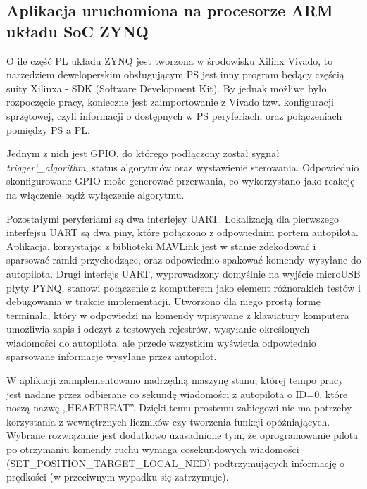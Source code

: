 \subsection{Aplikacja uruchomiona na procesorze ARM układu SoC ZYNQ}
O ile część PL układu ZYNQ jest tworzona w środowisku Xilinx Vivado, to narzędziem deweloperskim obsługującym PS jest inny program będący częścią suity Xilinxa - SDK (Software Development Kit). By jednak możliwe było rozpoczęcie pracy, konieczne jest zaimportowanie z Vivado tzw. konfiguracji sprzętowej, czyli informacji o dostępnych w PS peryferiach, oraz połączeniach pomiędzy PS a PL.

Jednym z nich jest GPIO, do którego podłączony został sygnał \textit{trigger\char`_algorithm}, status algorytmów oraz wystawienie sterowania. Odpowiednio skonfigurowane GPIO może generować przerwania, co wykorzystano jako reakcję na włączenie bądź wyłączenie algorytmu.

Pozostałymi peryferiami są dwa interfejsy UART. Lokalizacją dla pierwszego interfejsu UART są dwa piny, które połączono z odpowiednim portem autopilota. Aplikacja, korzystając z biblioteki MAVLink jest w stanie zdekodować i sparsować ramki przychodzące, oraz odpowiednio spakować komendy wysyłane do autopilota.
\newline Drugi interfejs UART, wyprowadzony domyślnie na wyjście microUSB płyty PYNQ, stanowi połączenie z komputerem jako element różnorakich testów i debugowania w trakcie implementacji. Utworzono dla niego prostą formę terminala, który w odpowiedzi na komendy wpisywane z klawiatury komputera umożliwia zapis i odczyt z testowych rejestrów, wysyłanie określonych wiadomości do autopilota, ale przede wszystkim wyświetla odpowiednio sparsowane informacje wysyłane przez autopilot.

W aplikacji zaimplementowano nadrzędną maszynę stanu, której tempo pracy jest nadane przez odbierane co sekundę wiadomości z autopilota o ID=0, które noszą nazwę „HEARTBEAT”. Dzięki temu prostemu zabiegowi nie ma potrzeby korzystania z wewnętrznych liczników czy tworzenia funkcji opóźniających. Wybrane rozwiązanie jest dodatkowo uzasadnione tym, że oprogramowanie pilota po otrzymaniu komendy ruchu wymaga cosekundowych wiadomości (SET\_POSITION\_TARGET\_LOCAL\_NED) podtrzymujących informację o prędkości (w przeciwnym wypadku się zatrzymuje). 

